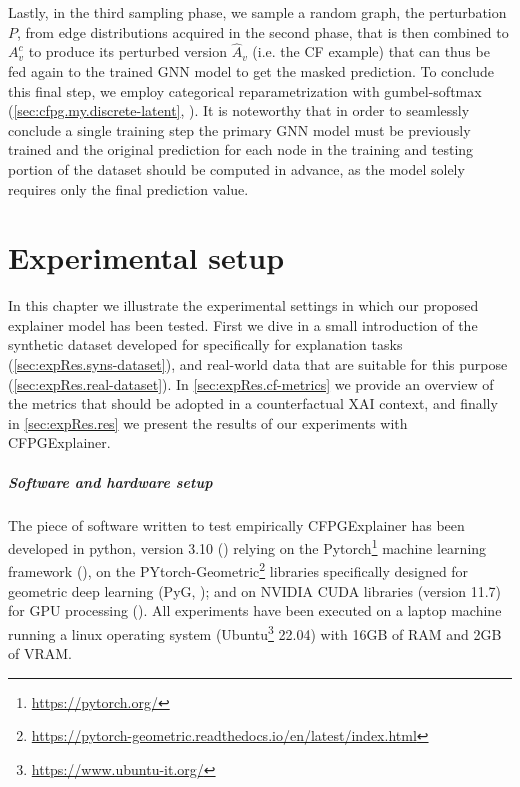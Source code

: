 \documentclass[binding=0.6cm]{sapthesis}
\newcommand{\mycite}[1]{(\cite{#1})}
\begin{document}
Lastly, in the third sampling phase, we sample a random graph, the perturbation $P$, from edge distributions acquired in the second phase, that is then combined to $A^c_v$ to produce its perturbed version $\hat{A}_v$ (i.e. the CF example) that can thus be fed again to the trained GNN model to get the masked prediction. To conclude this final step, we employ categorical reparametrization with gumbel-softmax (\cref{sec:cfpg.my.discrete-latent}, \cite{jang2017-gumbel}). 
It is noteworthy that in order to seamlessly conclude a single training step the primary GNN model must be previously trained and the original prediction for each node in the training and testing portion of the dataset should be computed in advance, as the model solely requires only the final prediction value.   



\chapter{Experimental setup}
\label{chap:4-expRes}
In this chapter we illustrate the experimental settings in which our proposed explainer model has been tested. First we dive in a small introduction of the synthetic dataset developed for specifically for explanation tasks (\cref{sec:expRes.syns-dataset}), and real-world data that are suitable for this purpose (\cref{sec:expRes.real-dataset}). In \cref{sec:expRes.cf-metrics} we provide an overview of the metrics that should be adopted in a counterfactual XAI context, and finally in \cref{sec:expRes.res} we present the results of our experiments with CFPGExplainer.

\paragraph{Software and hardware setup}
\label{sec:expRes.setup}
The piece of software written to test empirically CFPGExplainer has been developed in python, version 3.10 \mycite{vanRossum2009-python} relying on the Pytorch\footnote{\url{https://pytorch.org/}} machine learning framework \mycite{pytorch2019-NEURIPS}, on the PYtorch-Geometric\footnote{\url{https://pytorch-geometric.readthedocs.io/en/latest/index.html}} libraries specifically designed for geometric deep learning (PyG, \cite{fey2019-PyG}); and on NVIDIA CUDA libraries (version 11.7) for GPU processing \mycite{cudaToolkit}. All experiments have been executed on a laptop machine running a linux operating system (Ubuntu\footnote{\url{https://www.ubuntu-it.org/}} 22.04) with 16GB of RAM and 2GB of VRAM.  
\end{document}
